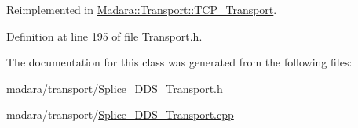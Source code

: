 Reimplemented in \hyperlink{classMadara_1_1Transport_1_1TCP__Transport_a2d4ff7935612176cf98a4feaa9d15510}{Madara::Transport::TCP\_\-Transport}.



Definition at line 195 of file Transport.h.



The documentation for this class was generated from the following files:\begin{DoxyCompactItemize}
\item 
madara/transport/\hyperlink{Splice__DDS__Transport_8h}{Splice\_\-DDS\_\-Transport.h}\item 
madara/transport/\hyperlink{Splice__DDS__Transport_8cpp}{Splice\_\-DDS\_\-Transport.cpp}\end{DoxyCompactItemize}
